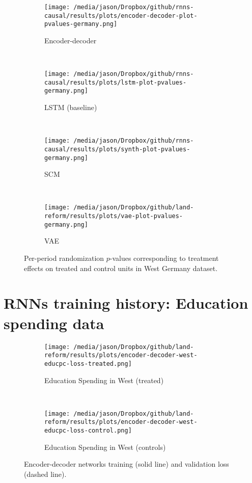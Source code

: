 \documentclass[12pt]{article}
\begin{document}
\begin{figure*}[htbp]
    \centering
    \begin{subfigure}[t]{0.5\textwidth}
        \centering
        \texttt{[image: /media/jason/Dropbox/github/rnns-causal/results/plots/encoder-decoder-plot-pvalues-germany.png]}
        \caption{Encoder-decoder}
    \end{subfigure}%
        ~ 
    \begin{subfigure}[t]{0.5\textwidth}
        \centering
        \texttt{[image: /media/jason/Dropbox/github/rnns-causal/results/plots/lstm-plot-pvalues-germany.png]}
        \caption{LSTM (baseline)}
    \end{subfigure}
        ~ 
    \begin{subfigure}[t]{0.5\textwidth}
        \centering
        \texttt{[image: /media/jason/Dropbox/github/rnns-causal/results/plots/synth-plot-pvalues-germany.png]}
        \caption{SCM}
    \end{subfigure}%
         ~ 
	\begin{subfigure}[t]{0.5\textwidth}
		\centering
		\texttt{[image: /media/jason/Dropbox/github/land-reform/results/plots/vae-plot-pvalues-germany.png]}
		\caption{VAE}
	\end{subfigure}
    \caption{Per-period randomization $p$-values corresponding to treatment effects on treated and control units in West Germany dataset. \label{germany-plot-pvalues}}
\end{figure*}

\section{RNNs training history: Education spending data}

\begin{figure*}[htbp]
	\centering
	\begin{subfigure}[t]{0.45\textwidth}
		\centering
		\texttt{[image: /media/jason/Dropbox/github/land-reform/results/plots/encoder-decoder-west-educpc-loss-treated.png]}
		\caption{Education Spending in West (treated)} 
	\end{subfigure}
	~ 
	\begin{subfigure}[t]{0.45\textwidth}
		\centering
		\texttt{[image: /media/jason/Dropbox/github/land-reform/results/plots/encoder-decoder-west-educpc-loss-control.png]}
		\caption{Education Spending in West (controls)}
	\end{subfigure}
	\caption{Encoder-decoder networks training (solid line) and validation loss (dashed line). \label{encoder-decoder-loss-capacity-west}} 
\end{figure*}
\end{document}
